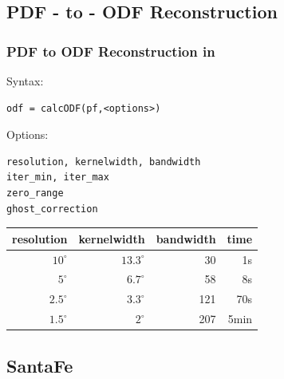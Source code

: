 \begin{frame}[fragile]
\begin{columns}
\begin{column}{3.1cm}
{      }
    \end{column}

  \end{columns}

\end{frame}

\subsection*{PDF - to - ODF Reconstruction}


\begin{frame}[fragile]
  \frametitle{PDF to ODF Reconstruction in \MTEX}

  Syntax:
  \begin{alertenv}
\begin{lstlisting}
odf = calcODF(pf,<options>)
\end{lstlisting}
  \end{alertenv}

Options:
\begin{lstlisting}
resolution, kernelwidth, bandwidth
iter_min, iter_max
zero_range
ghost_correction
\end{lstlisting}

\pause

\begin{table}[H]
  \centering
  \begin{tabular}{r r r r}
    \toprule
    resolution & kernelwidth  & bandwidth & time \\
    \midrule
    $10^\circ$  & $13.3^\circ$ & 30  & 1s  \\
    $5^\circ$   & $6.7^\circ$  & 58  & 8s \\
    $2.5^\circ$ & $3.3^\circ$  & 121 & 70s\\
    $1.5^\circ$ & $2^\circ$    & 207 & 5min\\
    \bottomrule
  \end{tabular}
\end{table}

\end{frame}


\subsection*{SantaFe}

